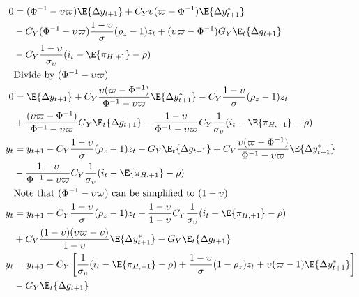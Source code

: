 \begin{align}   
    0  &= (\Phi^{-1} - \upsilon \varpi) \E \{ \Delta y_{t+1}\} +C_Y \upsilon ( \varpi - \Phi^{-1})\E \{\Delta y_{t+1}^* \} \nonumber\\
        &  -C_Y(\Phi^{-1} -\upsilon \varpi)\frac{1-\upsilon}{\sigma} (\rho_z - 1)z_t + (\upsilon \varpi  - \Phi^{-1}) G_Y \E_t\{\Delta g_{t+1}\}\nonumber\\
        &- C_Y\frac{1-\upsilon}{\sigma_\upsilon}(i_t - \E \{ \pi_{H,+1}\} - \rho)\\
    &\text{Divide by $(\Phi^{-1} - \upsilon \varpi)$}\\
    0  &= \E \{ \Delta y_{t+1}\} + C_Y\frac{\upsilon (\varpi - \Phi^{-1})}{\Phi^{-1} -\upsilon \varpi}\E \{\Delta y_{t+1}^* \} -C_Y\frac{1-\upsilon}{\sigma} (\rho_z - 1)z_t  \nonumber\\
        &+ \frac{(\upsilon \varpi  - \Phi^{-1})}{\Phi^{-1} -\upsilon \varpi} G_Y \E_t\{\Delta g_{t+1}\}- \frac{1-\upsilon}{\Phi^{-1} -\upsilon \varpi}C_Y\frac{1}{\sigma_\upsilon}(i_t - \E \{ \pi_{H,+1}\} - \rho)\\
    y_t  &= y_{t+1}  - C_Y \frac{1-\upsilon}{\sigma} (\rho_z - 1)z_t - G_Y \E_t\{\Delta g_{t+1}\} + C_Y\frac{\upsilon ( \varpi - \Phi^{-1})}{\Phi^{-1} -\upsilon \varpi}\E \{\Delta y_{t+1}^* \} \nonumber \\ 
    &- \frac{1-\upsilon}{\Phi^{-1} -\upsilon \varpi}C_Y \frac{1}{\sigma_\upsilon}(i_t - \E \{ \pi_{H,+1}\} - \rho) \\
    &\text{Note that $(\Phi^{-1} -\upsilon \varpi)$ can be simplified to $(1-\upsilon)$ }\\
    y_t  &= y_{t+1}  -C_Y \frac{1-\upsilon}{\sigma} (\rho_z - 1)z_t - \frac{1-\upsilon}{1-\upsilon} C_Y \frac{1}{\sigma_\upsilon}(i_t - \E \{ \pi_{H,+1}\} - \rho) \nonumber \\ 
    &+ C_Y\frac{(1-\upsilon)(\upsilon \varpi - \upsilon)}{1 - \upsilon}\E \{\Delta y_{t+1}^* \} - G_Y \E_t\{\Delta g_{t+1}\}\\
    y_t  &= y_{t+1} - C_Y\left[\frac{1}{\sigma_\upsilon}(i_t - \E \{ \pi_{H,+1}\} - \rho) + \frac{1-\upsilon}{\sigma} (1-\rho_z)z_t + \upsilon (\varpi - 1)\E \{\Delta y_{t+1}^* \}\right] \nonumber \\ 
    & - G_Y \E_t \{\Delta g_{t+1}\} \label{eq:dynamic_is_end}
\end{align}
\newpage
